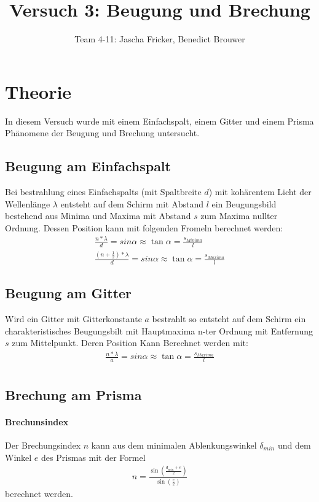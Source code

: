 \documentclass[11pt, a4paper]{article}
\title{Versuch 3: Beugung und Brechung}
\author{Team 4-11: Jascha Fricker, Benedict Brouwer}
\begin{document}
    \maketitle

    \tableofcontents

    \newpage

    \section{Theorie}
    \FloatBarrier
    In diesem Versuch wurde mit einem Einfachspalt, einem Gitter und einem Prisma Phänomene der Beugung und Brechung untersucht. 

    \subsection{Beugung am Einfachspalt}
    Bei bestrahlung eines Einfachspalts (mit Spaltbreite $d$) mit kohärentem Licht der Wellenlänge $\lambda$ entsteht auf dem Schirm mit Abstand $l$ ein Beugungsbild bestehend aus Minima und Maxima mit Abstand $s$ zum Maxima nullter Ordnung. Dessen Position kann mit folgenden Fromeln berechnet werden:
    \begin{align}
        \frac{n * \lambda}{d} = sin{\alpha} \approx \tan{\alpha} = \frac{s_{Minima}}{l} \label{eq:einfachspalt} \\
        \frac{(n + \frac{1}{2})* \lambda}{d} = sin{\alpha} \approx \tan{\alpha} = \frac{s_{Maxima}}{l} 
    \end{align}
    \subsection{Beugung am Gitter}
    Wird ein Gitter mit Gitterkonstante $a$ bestrahlt so entsteht auf dem Schirm ein charakteristisches Beugungsbilt mit Hauptmaxima n-ter Ordnung mit Entfernung $s$ zum Mittelpunkt. Deren Position Kann Berechnet werden mit:
    \begin{align}
        \frac{n * \lambda}{a} = sin{\alpha} \approx \tan{\alpha} = \frac{s_{Maxima}}{l} \label{eq:Gitter} \\
    \end{align}

    \subsection{Brechung am Prisma}

    \paragraph{Brechunsindex}
    Der Brechungsindex $n$ kann aus dem minimalen Ablenkungswinkel $\delta_{min}$ und dem Winkel $e$ des Prismas mit der Formel
    \begin{align}
        n = \frac{\sin\left(\frac{d_{min} + e}{2}\right)}{\sin\left(\frac{e}{2}\right)} \label{eq:brechungsindex}
    \end{align}
    berechnet werden.
    
\end{document}
